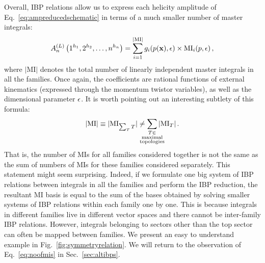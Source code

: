\documentclass[main.tex]{subfiles}
\begin{document}
Overall, IBP relations allow us to express each helicity amplitude of Eq.~\ref{eq:ampreducedschematic} in terms of a much smaller number of master integrals:
\begin{equation} \label{eq:ampafterIBP}
    	A_n^{(L)} \left(1^{h_1}, 2^{h_2}, \ldots, n^{h_n} \right) =  
     \sum_{i=1}^{|\text{MI}|} g_i(p(\mathbf{x}), \epsilon) \times \text{MI}_i(p,\epsilon)\,,
\end{equation}
where $|\text{MI}|$ denotes the total number of linearly independent master integrals in all the families. Once again, the coefficients are rational functions of external kinematics (expressed through the momentum twistor variables), as well as the dimensional parameter $\epsilon$. It is worth pointing out an interesting subtlety of this formula:
\begin{equation} \label{eq:noofmis}
    |\text{MI}| \equiv |\text{MI}_{\sum_T T}| \neq \sum_{\mathclap{\substack{T \in \\ \text{maximal} \\ \text{topologies}}}} |\text{MI}_T| \,.
\end{equation}
That is, the number of MIs for all families considered together is not the same as the sum of numbers of MIs for these families considered separately. This statement might seem surprising. Indeed, if we formulate one big system of IBP relations between integrals in all the families and perform the IBP reduction, the resultant MI basis is equal to the sum of the bases obtained by solving smaller systems of IBP relations within each family one by one. This is because integrals in different families live in different vector spaces and there cannot be inter-family IBP relations. However, integrals belonging to sectors other than the top sector can often be mapped between families. We present an easy to understand example in Fig.~\ref{fig:symmetryrelation}. We will return to the observation of Eq.~\ref{eq:noofmis} in Sec.~\ref{sec:altibps}. 
\end{document}
